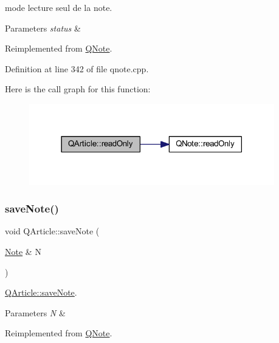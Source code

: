mode lecture seul de la note. 


\begin{DoxyParams}{Parameters}
{\em status} & \\
\hline
\end{DoxyParams}


Reimplemented from \hyperlink{class_q_note_ae6fb14b839acc1979b145a892d6a0a92}{Q\+Note}.



Definition at line 342 of file qnote.\+cpp.

Here is the call graph for this function\+:\nopagebreak
\begin{figure}[H]
\begin{center}
\leavevmode
\includegraphics[width=302pt]{class_q_article_af6c14f4ce3df750a0e1a22207309068e_cgraph}
\end{center}
\end{figure}
\mbox{\label{class_q_article_ae59d03688947d16b86f9ab10384894ec}} 
\subsubsection{\texorpdfstring{save\+Note()}{saveNote()}}
{\footnotesize\ttfamily void Q\+Article\+::save\+Note (\begin{DoxyParamCaption}\item[{\hyperlink{class_note}{Note} \&}]{N }\end{DoxyParamCaption})\hspace{0.3cm}{\ttfamily [virtual]}}



\hyperlink{class_q_article_ae59d03688947d16b86f9ab10384894ec}{Q\+Article\+::save\+Note}. 


\begin{DoxyParams}{Parameters}
{\em N} & \\
\hline
\end{DoxyParams}


Reimplemented from \hyperlink{class_q_note_a577f684ef199a17dc468d706b1383581}{Q\+Note}.



